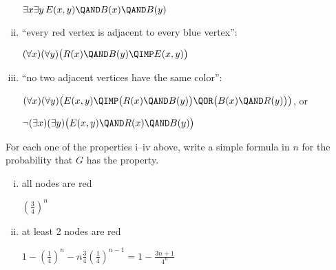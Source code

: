 \begin{problem}
\begin{enumerate}[(i)]
\begin{solution}
$\exists x\exists y\, 
	E(x,y) \QAND 
	B(x) \QAND B(y)$
\end{solution}
\examspace[0.75in]

\item ``every red vertex is adjacent to every blue vertex'': 

\begin{solution}
$(\forall x)(\forall y)\bigl( 
	R(x) \QAND B(y)
	\QIMP
	E(x,y)
\bigr)$
\end{solution}

\examspace[0.75in]

\item  \label{item-difficult} ``no two adjacent vertices have the same color'': 

\begin{solution}
$(\forall x)(\forall y)\bigl( 
	E(x,y) 
	\QIMP
	\bigl( R(x) \QAND B(y) \bigr)
	\QOR
	\bigl( B(x) \QAND R(y) \bigr)
\bigr)$, or

$\neg (\exists x)(\exists y)\bigl(
	E(x,y) \QAND
	R(x) \QAND B(y) 
\bigr)$
\end{solution}

\examspace[0.75in]

\end{enumerate}


\ppart For each one of the properties i--iv above, write a simple
formula in $n$ for the probability that $G$ has the property.

\begin{enumerate}[(i)]

\item all nodes are red
\begin{solution}
\brule{0.5in}	$(\tfrac{3}{4})^n$
\end{solution}
 
%

%

\item at least 2 nodes are red
\begin{solution}
 	$1 - (\tfrac{1}{4})^n - n\tfrac{3}{4}(\tfrac{1}{4})^{n-1}
	=
	1 - \tfrac{3n+1}{4^n}$
\end{solution}\brule{0.5in}


\end{enumerate}
\end{problem}
